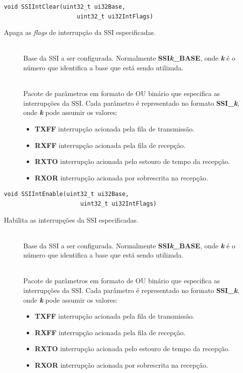 \begin{lstlisting}[style=funcao]
	void SSIIntClear(uint32_t ui32Base,
					 uint32_t ui32IntFlags)
\end{lstlisting}

Apaga as \emph{flags} de interrupção da SSI especificadas.

\begin{description}
	\item []\hfill \\
	Base da SSI a ser configurada. Normalmente \textbf{SSI\emph{k}\_BASE}, onde \textbf{\emph{k}} é o número que identifica a base que está sendo utilizada.
	
	\item []\hfill \\
	Pacote de parâmetros em formato de OU binário que especifica as interrupções da SSI. Cada parâmetro é representado no formato \textbf{SSI\_\emph{k}}, onde \textbf{\emph{k}} pode assumir os valores:
	\begin{itemize}
		\item \textbf{TXFF} interrupção acionada pela fila de transmissão.
		\item \textbf{RXFF} interrupção acionada pela fila de recepção.
		\item \textbf{RXTO} interrupção acionada pelo estouro de tempo da recepção.
		\item \textbf{RXOR} interrupção acionada por sobrescrita na recepção.
	\end{itemize}
\end{description}

\begin{lstlisting}[style=funcao]
	void SSIIntEnable(uint32_t ui32Base,
					  uint32_t ui32IntFlags)
\end{lstlisting}

Habilita as interrupções da SSI especificadas.

\begin{description}
	\item []\hfill \\
	Base da SSI a ser configurada. Normalmente \textbf{SSI\emph{k}\_BASE}, onde \textbf{\emph{k}} é o número que identifica a base que está sendo utilizada.
	
	\item []\hfill \\
	Pacote de parâmetros em formato de OU binário que especifica as interrupções da SSI. Cada parâmetro é representado no formato \textbf{SSI\_\emph{k}}, onde \textbf{\emph{k}} pode assumir os valores:
	\begin{itemize}
		\item \textbf{TXFF} interrupção acionada pela fila de transmissão.
		\item \textbf{RXFF} interrupção acionada pela fila de recepção.
		\item \textbf{RXTO} interrupção acionada pelo estouro de tempo da recepção.
		\item \textbf{RXOR} interrupção acionada por sobrescrita na recepção.
	\end{itemize}
\end{description}

